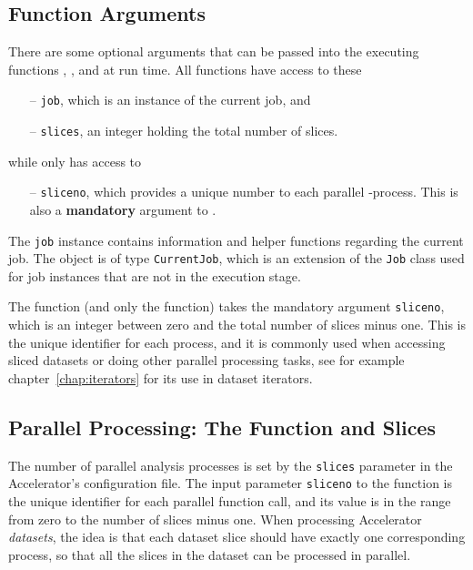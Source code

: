 \subsection{Function Arguments}
There are some optional arguments that can be passed into the
executing functions \prepare, \analysis, and \synthesis at run time.
All functions have access to these
\begin{itemize}
\item[--] \texttt{job}, which is an instance of the current job, and
\item[--] \texttt{slices}, an integer holding the total number of slices.
\end{itemize}
while only \analysis has access to
\begin{itemize}
\item[--] \texttt{sliceno}, which provides a unique number to each
  parallel \analysis-process.  This is also a \textbf{mandatory}
  argument to \analysis.
\end{itemize}
The \texttt{job} instance contains information and helper functions
regarding the current job.  The object is of type \texttt{CurrentJob},
which is an extension of the \texttt{Job} class used for job instances
that are not in the execution stage.

The \analysis function (and only the \analysis function) takes the
mandatory argument \texttt{sliceno}, which is an integer between zero
and the total number of slices minus one.  This is the unique
identifier for each \analysis process, and it is commonly used when
accessing sliced datasets or doing other parallel processing tasks,
see for example chapter~\ref{chap:iterators} for its use in dataset
iterators.



\subsection{Parallel Processing:  The \analysis Function and Slices}
The number of parallel analysis processes is set by the
\texttt{slices} parameter in the Accelerator's configuration file.
The input parameter \texttt{sliceno} to the \analysis function is the
unique identifier for each parallel function call, and its value is in
the range from zero to the number of slices minus one.  When
processing Accelerator \textsl{datasets}, the idea is that each
dataset slice should have exactly one corresponding \analysis process,
so that all the slices in the dataset can be processed in parallel.


